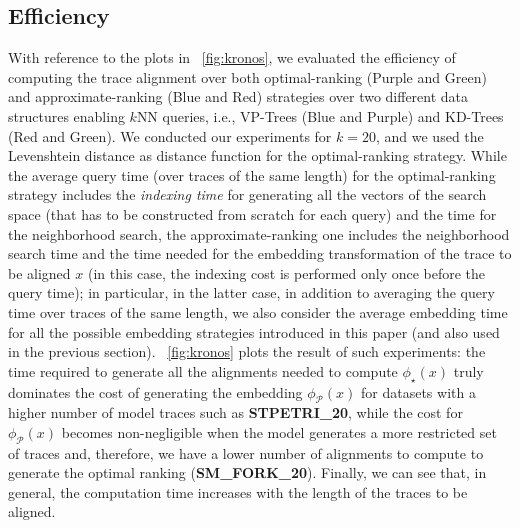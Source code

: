 \subsection{Efficiency}\label{subsec:efficio}
With reference to the plots in \figurename~\ref{fig:kronos}, we evaluated the efficiency of computing the trace alignment over both optimal-ranking ({\color{ggplotPurple}Purple} and {\color{ggplotGreen}Green}) and approximate-ranking ({\color{ggplotBlue}Blue} and {\color{ggplotRed}Red}) strategies over two different data structures enabling $k$NN queries, i.e., VP-Trees ({\color{ggplotBlue}Blue} and {\color{ggplotPurple}Purple}) and KD-Trees ({\color{ggplotRed}Red} and {\color{ggplotGreen}Green}). We conducted our experiments for $k=20$, and we used the Levenshtein distance as distance function for the optimal-ranking strategy. While the average query time (over traces of the same length) for the optimal-ranking strategy includes the \textit{indexing time} for generating all the vectors of the search space (that has to be constructed from scratch for each query) and the time for the neighborhood search, the approximate-ranking one includes the neighborhood search time and the time needed for the embedding transformation of the trace to be aligned $x$ (in this case, the indexing cost is performed only once before the query time); in particular, in the latter case, in addition to averaging the query time over traces of the same length, we also consider the average embedding time for all the possible embedding strategies introduced in this paper (and also used in the previous section). \figurename~\ref{fig:kronos} plots the result of such experiments: the time required to generate all the alignments needed to compute $\phi_\star(x)$ truly dominates the cost of generating the embedding $\phi_{\mathcal{P}}(x)$ for datasets with a higher number of model traces such as \textbf{STPETRI\_20}, while the cost for $\phi_{\mathcal{P}}(x)$ becomes non-negligible when the model generates a more restricted set of traces and, therefore, we have a lower number of alignments to compute to generate the optimal ranking (\textbf{SM\_FORK\_20}). Finally, we can see that, in general, the computation time increases with the length of the traces to be aligned.
